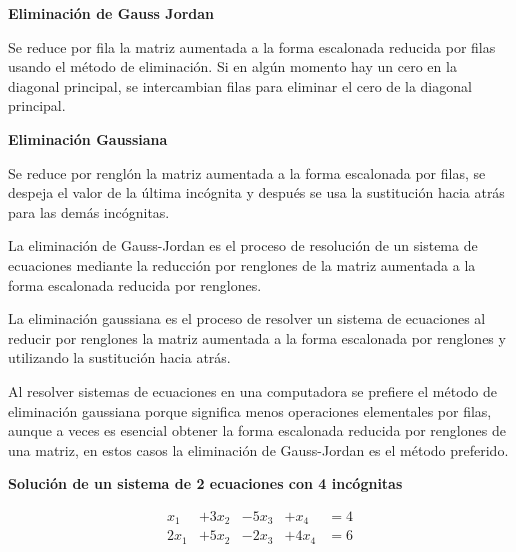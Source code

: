 \documentclass{article}
\begin{document}
\begin{tcolorbox}[colback=blue!10!white,colframe=blue!60!black,title=Métodos]
    \begin{large}
        \textbf{Eliminación de Gauss Jordan}
    \end{large}

    Se reduce por fila la matriz aumentada a la forma escalonada reducida por filas usando el método de eliminación. Si en algún momento hay un cero en la diagonal principal, se intercambian filas para eliminar el cero de la diagonal principal. \newline

    \begin{large}
        \textbf{Eliminación Gaussiana}
    \end{large}

    Se reduce por renglón la matriz aumentada a la forma escalonada por filas, se despeja el valor de la última incógnita y después se usa la sustitución hacia atrás para las demás incógnitas.
\end{tcolorbox}

La eliminación de Gauss-Jordan es el proceso de resolución de un sistema de ecuaciones mediante la reducción por renglones de la matriz aumentada a la forma escalonada reducida por renglones.

La eliminación gaussiana es el proceso de resolver un sistema de ecuaciones al reducir por renglones la matriz aumentada a la forma escalonada por renglones y utilizando la sustitución hacia atrás.

Al resolver sistemas de ecuaciones en una computadora se
prefiere el método de eliminación gaussiana porque significa menos operaciones elementales por filas, aunque a veces es esencial obtener la forma escalonada reducida por renglones de una matriz, en estos casos la eliminación de Gauss-Jordan es el método preferido.

\begin{large}
    \textbf{Solución de un sistema de 2 ecuaciones con 4 incógnitas}
\end{large}

\begin{equation*}
    \begin{aligned}
    x_1 &+ 3x_2 &- 5x_3 &+ x_4 &= 4 \\
    2x_1 &+ 5x_2 &- 2x_3 &+ 4x_4 &= 6    
    \end{aligned}
\end{equation*}
\end{document}
